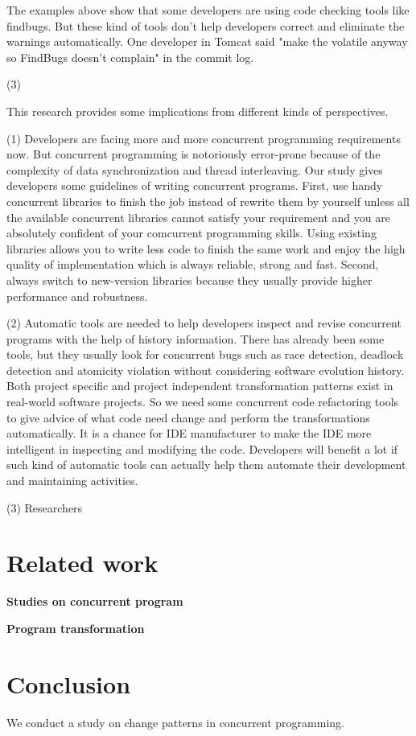 \documentclass[conference]{IEEEtran}
\begin{document}
The examples above show that some developers are using code checking tools like findbugs. But these kind of tools don't help developers correct and eliminate the warnings automatically. One developer in Tomcat said "make the volatile anyway so FindBugs doesn't complain" in the commit log.


(3) 

This research provides some implications from different kinds of perspectives.

(1) Developers are facing more and more concurrent programming requirements now. But concurrent programming is notoriously error-prone because of the complexity of data synchronization and thread interleaving. Our study gives developers some guidelines of writing concurrent programs. First, use handy concurrent libraries to finish the job instead of rewrite them by yourself unless all the available concurrent libraries cannot satisfy your requirement and you are absolutely confident of your comcurrent programming skills. Using existing libraries allows you to  write less code to finish the same work and enjoy the high quality of implementation which is always reliable, strong and fast. Second, always switch to new-version libraries because they usually provide higher performance and robustness.

(2) Automatic tools are needed to help developers inspect and revise concurrent programs with the help of history information. There has already been some tools, but they usually look for concurrent bugs such as race detection, deadlock detection and atomicity violation without considering software evolution history. Both project specific and project independent transformation patterns exist in real-world software projects. So we need some concurrent code refactoring tools to give advice of what code need change and perform the transformations automatically. It is a chance for IDE manufacturer to make the IDE more intelligent in inspecting and modifying the code. Developers will benefit a lot if such kind of automatic tools can actually help them automate their development and maintaining activities.

(3) Researchers 

\section{Related work}
\textbf{Studies on concurrent program}

\textbf{Program transformation}

\section{Conclusion}
We conduct a study on change patterns in concurrent programming.
\end{document}
